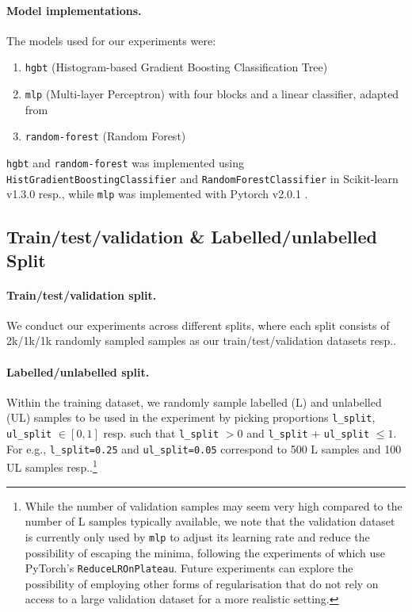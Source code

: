 \documentclass{article}
\begin{document}
\clearpage
\paragraph{Model implementations.}
The models used for our experiments were: \begin{enumerate}
  \item \texttt{hgbt} (Histogram-based Gradient Boosting Classification Tree)
  \item \texttt{mlp} (Multi-layer Perceptron) with four blocks and a linear classifier,
  adapted from \cite{gorishniy2021revisiting}
  \item \texttt{random-forest} (Random Forest)
\end{enumerate}
\texttt{hgbt} and \texttt{random-forest} was implemented using
\texttt{HistGradientBoostingClassifier} and \texttt{RandomForestClassifier} in
Scikit-learn v1.3.0 \cite{pedregosa2011scikitlearn} resp., while \texttt{mlp} was
implemented with Pytorch v2.0.1 \cite{paszke2019pytorch}.

\subsection{Train/test/validation \& Labelled/unlabelled Split}

\paragraph{Train/test/validation split.}
We conduct our experiments across different splits, where each split consists of
2k/1k/1k randomly sampled samples as our train/test/validation datasets resp..

\paragraph{Labelled/unlabelled split.}
Within the training dataset, we randomly sample labelled (L) and unlabelled (UL) samples
to be used in the experiment by picking proportions \texttt{l\_split},
\texttt{ul\_split} $\in [0, 1]$ resp. such that \texttt{l\_split} $> 0$ and
\texttt{l\_split} $+$ \texttt{ul\_split} $\leq 1$.
For e.g., \texttt{l\_split=0.25} and \texttt{ul\_split=0.05} correspond to 500 L samples
and 100 UL samples resp..\footnote{%
  While the number of validation samples may seem very high compared to the number of L
  samples typically available, we note that the validation dataset is currently only
  used by \texttt{mlp} to adjust its learning rate and reduce the possibility of
  escaping the minima, following the experiments of \cite{grinsztajn2022why} which use
  PyTorch's \texttt{ReduceLROnPlateau}.
  Future experiments can explore the possibility of employing other forms of
  regularisation that do not rely on access to a large validation dataset for a more
  realistic setting.
}
\end{document}
